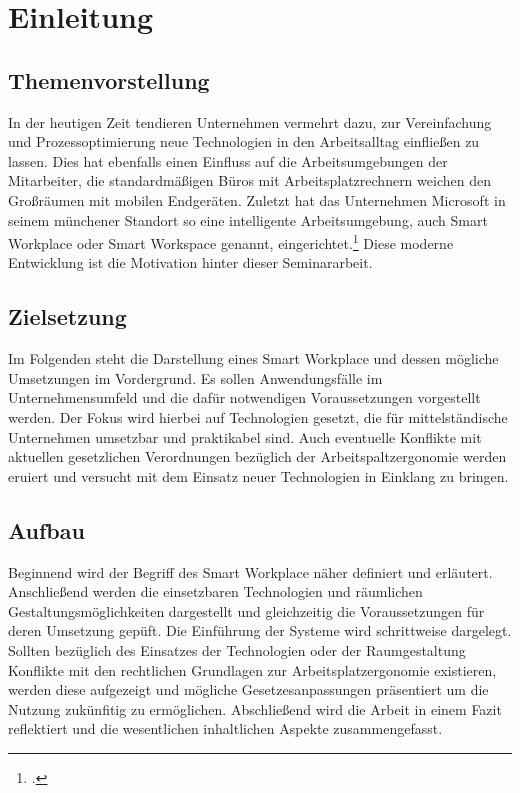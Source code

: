 \section{Einleitung}
\subsection{Themenvorstellung}
In der heutigen Zeit tendieren Unternehmen vermehrt dazu, zur Vereinfachung und Prozessoptimierung neue Technologien in den Arbeitsalltag einfließen zu lassen. Dies hat ebenfalls einen Einfluss auf die Arbeitsumgebungen der Mitarbeiter, die standardmäßigen Büros mit Arbeitsplatzrechnern weichen den Großräumen mit mobilen Endgeräten. Zuletzt hat das Unternehmen Microsoft in seinem münchener Standort so eine intelligente Arbeitsumgebung, auch Smart Workplace oder Smart Workspace genannt, eingerichtet.\footcite[Vgl.][]{MicrosoftArtikel} Diese moderne Entwicklung ist die Motivation hinter dieser Seminararbeit.

\subsection{Zielsetzung}
Im Folgenden steht die Darstellung eines Smart Workplace und dessen mögliche Umsetzungen im Vordergrund. Es sollen Anwendungsfälle im Unternehmensumfeld und die dafür notwendigen Voraussetzungen vorgestellt werden. Der Fokus wird hierbei auf Technologien gesetzt, die für mittelständische Unternehmen umsetzbar und praktikabel sind. Auch eventuelle Konflikte mit aktuellen gesetzlichen Verordnungen bezüglich der Arbeitspaltzergonomie werden eruiert und versucht mit dem Einsatz neuer Technologien in Einklang zu bringen.

\subsection{Aufbau}
Beginnend wird der Begriff des Smart Workplace näher definiert und erläutert. Anschließend werden die einsetzbaren Technologien und räumlichen Gestaltungsmöglichkeiten dargestellt und gleichzeitig die Voraussetzungen für deren Umsetzung gepüft. Die Einführung der Systeme wird schrittweise dargelegt. Sollten bezüglich des Einsatzes der Technologien oder der Raumgestaltung Konflikte mit den rechtlichen Grundlagen zur Arbeitsplatzergonomie existieren, werden diese aufgezeigt und mögliche Gesetzesanpassungen präsentiert um die Nutzung zukünfitig zu ermöglichen. Abschließend wird die Arbeit in einem Fazit reflektiert und die wesentlichen inhaltlichen Aspekte zusammengefasst.